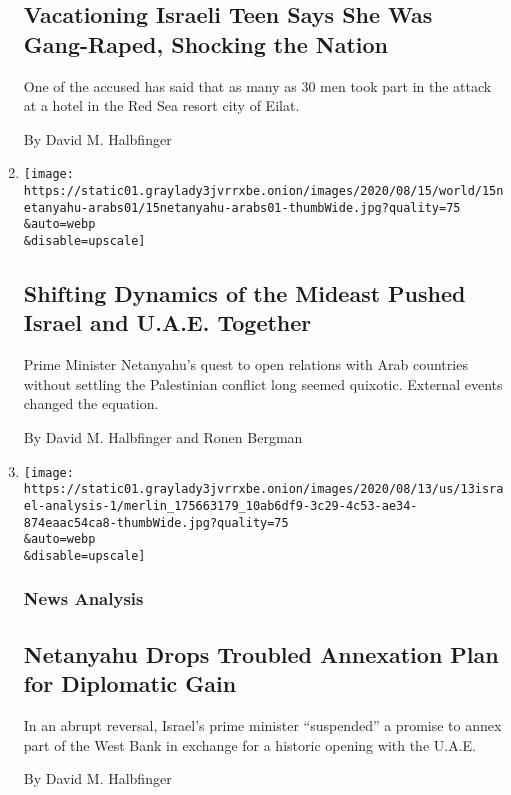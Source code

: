 \begin{enumerate}
{  \subsection{Vacationing Israeli Teen Says She Was Gang-Raped, Shocking
  the
  Nation}\label{vacationing-israeli-teen-says-she-was-gang-raped-shocking-the-nation}}

  One of the accused has said that as many as 30 men took part in the
  attack at a hotel in the Red Sea resort city of Eilat.

  By David M. Halbfinger
\item
  \href{/2020/08/15/world/middleeast/israel-uae-netanyahu-arabs.html}{}

  \texttt{[image: https://static01.graylady3jvrrxbe.onion/images/2020/08/15/world/15netanyahu-arabs01/15netanyahu-arabs01-thumbWide.jpg?quality=75\\\&auto=webp\\\&disable=upscale]}

  \hypertarget{shifting-dynamics-of-the-mideast-pushed-israel-and-uae-together}{%
  \subsection{Shifting Dynamics of the Mideast Pushed Israel and U.A.E.
  Together}\label{shifting-dynamics-of-the-mideast-pushed-israel-and-uae-together}}

  Prime Minister Netanyahu's quest to open relations with Arab countries
  without settling the Palestinian conflict long seemed quixotic.
  External events changed the equation.

  By David M. Halbfinger and Ronen Bergman
\item
  \href{/2020/08/13/world/middleeast/israel-uae-annexation.html}{}

  \texttt{[image: https://static01.graylady3jvrrxbe.onion/images/2020/08/13/us/13israel-analysis-1/merlin\_175663179\_10ab6df9-3c29-4c53-ae34-874eaac54ca8-thumbWide.jpg?quality=75\\\&auto=webp\\\&disable=upscale]}

  \hypertarget{news-analysis}{%
  \subsubsection{News Analysis}\label{news-analysis}}

  \hypertarget{netanyahu-drops-troubled-annexation-plan-for-diplomatic-gain}{%
  \subsection{Netanyahu Drops Troubled Annexation Plan for Diplomatic
  Gain}\label{netanyahu-drops-troubled-annexation-plan-for-diplomatic-gain}}

  In an abrupt reversal, Israel's prime minister ``suspended'' a promise
  to annex part of the West Bank in exchange for a historic opening with
  the U.A.E.

  By David M. Halbfinger
\end{enumerate}

